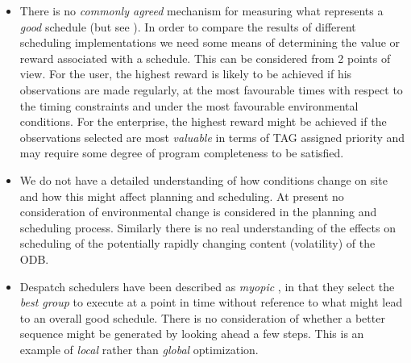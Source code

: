 \begin{itemize}


\item There is no \emph{commonly agreed} mechanism for measuring what represents a \emph{good} schedule (but see \citep{steele97control}). In order to compare the results of different scheduling implementations we need some means of determining the value or reward associated with a schedule. This can be considered from 2 points of view. For the user, the highest reward is likely to be achieved if his observations are made regularly, at the most favourable times with respect to the timing constraints and under the most favourable environmental conditions. For the enterprise, the highest reward might be achieved if the observations selected are most \emph{valuable} in terms of TAG assigned priority and may require some degree of program completeness to be satisfied.

\item We do not have a detailed understanding of how conditions change on site and how this might affect planning and scheduling. At present no consideration of environmental change is considered in the planning and scheduling process. Similarly there is no real understanding of the effects on scheduling of the potentially rapidly changing content (volatility) of the ODB.

\item Despatch schedulers have been described as \emph{myopic} \citep{cicirello01random}, in that they select the \emph{best group} to execute at a point in time without reference to what might lead to an overall good schedule. There is no consideration of whether a better sequence might be generated by looking ahead a few steps. This is an example of \emph{local} rather than \emph{global} optimization.


\end{itemize}

